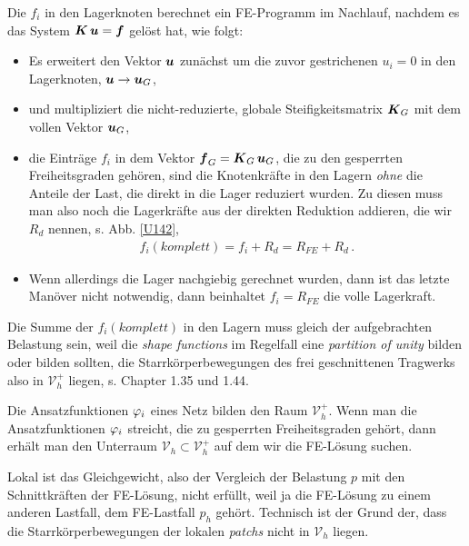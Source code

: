 {{{Die $f_i$ in den Lagerknoten berechnet ein FE-Programm im Nachlauf, nachdem es das System $\mbox{\boldmath $K$}\,\mbox{\boldmath $u$} = \mbox{\boldmath $f$}$ gel\"{o}st hat, wie folgt: \\
\begin{itemize}
  \item Es erweitert den Vektor $\mbox{\boldmath $u$}$ zun\"{a}chst um die zuvor gestrichenen $u_i = 0$ in den Lagerknoten, $\mbox{\boldmath $u$} \to \mbox{\boldmath $u$}_{G}$,
  \item und multipliziert die nicht-reduzierte, globale Steifigkeitsmatrix $\mbox{\boldmath $K$}_{G}$ mit dem vollen Vektor $\mbox{\boldmath $u$}_{G}$,
  \item die Eintr\"{a}ge $f_i$ in dem Vektor $\mbox{\boldmath $f$}_{G} = \mbox{\boldmath $K$}_{G}\,\mbox{\boldmath $u$}_{G}$, die zu den gesperrten Freiheitsgraden geh\"{o}ren, sind die Knotenkr\"{a}fte in den Lagern {\em ohne\/} die Anteile der Last, die direkt in die Lager reduziert wurden. Zu diesen muss man also noch die Lagerkr\"{a}fte aus der direkten Reduktion addieren, die wir $R_{d}$ nennen, s. Abb. \ref{U142},
      \begin{align}
      f_i(komplett) = f_i +  R_{d} = R_{FE} + R_{d}\,.
      \end{align}
      \item Wenn allerdings die Lager nachgiebig gerechnet wurden, dann ist das letzte Man\"{o}ver nicht notwendig, dann beinhaltet $f_i = R_{FE}$ die volle Lagerkraft.
\end{itemize}

Die Summe der $f_i (komplett)$ in den Lagern muss gleich der aufgebrachten Belastung sein, weil die {\em shape functions\/} im Regelfall eine {\em partition of unity\/} bilden oder bilden sollten, die Starrk\"{o}rperbewegungen des frei geschnittenen Tragwerks also in $\mathcal{V}_h^+$ liegen, s. \cite{Ha5} Chapter 1.35 und 1.44. 

Die Ansatzfunktionen $\varphi_i$ eines Netz bilden den Raum $\mathcal{V}_h^+$. Wenn man die Ansatzfunktionen $\varphi_i$ streicht, die zu gesperrten Freiheitsgraden geh\"{o}rt, dann erh\"{a}lt man den Unterraum $\mathcal{V}_h \subset \mathcal{V}_h^+$ auf dem wir die FE-L\"{o}sung suchen.

Lokal ist das Gleichgewicht, also der Vergleich der Belastung $p$ mit den Schnittkr\"{a}ften der FE-L\"{o}sung, nicht erf\"{u}llt, weil ja die FE-L\"{o}sung zu einem anderen Lastfall, dem FE-Lastfall $p_h$ geh\"{o}rt. Technisch ist der Grund der, dass die Starrk\"{o}rperbewegungen der lokalen {\em patchs\/} nicht in $\mathcal{V}_h$ liegen.

}}}
